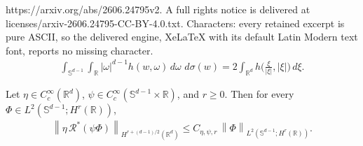 \documentclass[10pt,a4paper]{amsart}
\newcommand{\R}{\mathbb{R}}
\newcommand{\Sph}{\mathbb S}
\newcommand{\abs}[1]{\left|#1\right|}
\newcommand{\ddsigma}{\,d\sigma}
\newcommand{\norm}[1]{\left\|#1\right\|}
\begin{document}
https://arxiv.org/abs/2606.24795v2. A full rights notice is delivered at licenses/arxiv-2606.24795-CC-BY-4.0.txt. Characters: every retained excerpt is pure ASCII, so the delivered engine, XeLaTeX with its default Latin Modern text font, reports no missing character.
\begin{align}
    \int_{\Sph^{d-1}}\!\!\int_\R \abs{\omega}^{d-1}h(w,\omega)\,d\omega\,\ddsigma(w)
    =2\int_{\R^d} h\big(\tfrac{\xi}{\abs{\xi}},\abs{\xi}\big)\,d\xi .
    \label{eq:antipodal}
\end{align}

\begin{lemma}
\label{lem:localized-dual-radon}
Let $\eta\in C_c^\infty(\R^d)$, $\psi\in C_c^\infty(\Sph^{d-1}\times\R)$, and
$r\ge0$. Then for every $\Phi\in L^2(\Sph^{d-1};H^r(\R))$,
\begin{align}
    \norm{\eta\,\mathcal R^*(\psi\Phi)}_{H^{r+(d-1)/2}(\R^d)}
    \le C_{\eta,\psi,r}\,\norm{\Phi}_{L^2(\Sph^{d-1};H^r(\R))}.
    \label{eq:localized-dual-radon-estimate}
\end{align}
\end{lemma}
\end{document}
